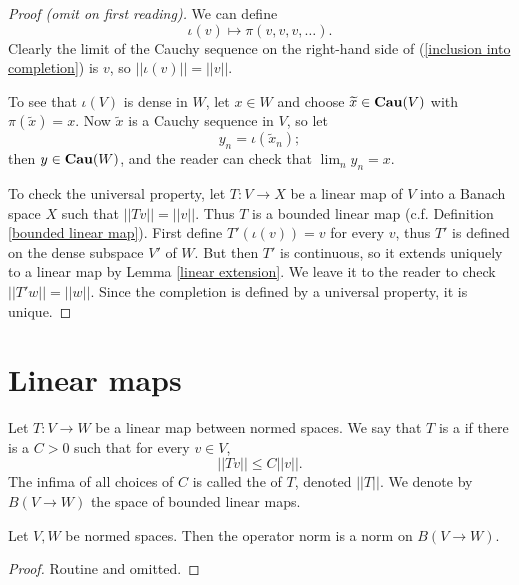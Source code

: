 \begin{proof}[Proof (omit on first reading)]
We can define
\begin{equation}
\label{inclusion into completion}
\iota(v) \mapsto \pi(v, v, v, \dots).
\end{equation}
Clearly the limit of the Cauchy sequence on the right-hand side of (\ref{inclusion into completion}) is $v$, so $||\iota(v)|| = ||v||$.

To see that $\iota(V)$ is dense in $W$, let $x \in W$ and choose $\widetilde x \in \mathbf{Cau} (V)$ with $\pi(\widetilde x) = x$.
Now $\widetilde x$ is a Cauchy sequence in $V$, so let
\[y_{n} = \iota(\widetilde x_{n});\]
then $y \in \mathbf{Cau} (W)$, and the reader can check that $\lim_{n} y_{n} = x$.

To check the universal property, let $T: V \to X$ be a linear map of $V$ into a Banach space $X$ such that $||Tv|| = ||v||$.
Thus $T$ is a bounded linear map (c.f. Definition \ref{bounded linear map}). First define $T'(\iota(v)) = v$ for every $v$, thus $T'$ is defined on the dense subspace $V'$ of $W$.
But then $T'$ is continuous, so it extends uniquely to a linear map by Lemma \ref{linear extension}. We leave it to the reader to check $||T'w|| = ||w||$.
Since the completion is defined by a universal property, it is unique.
\end{proof}

\section{Linear maps}
\begin{definition}
\label{bounded linear map}
Let $T: V\to W$ be a linear map between normed spaces. We say that $T$ is a  if there is a $C>0$ such that for every $v \in V$,
\[||Tv|| \leq C||v||.\]
The infima of all choices of $C$ is called the  of $T$, denoted $||T||$.
We denote by $B(V \to W)$ the space of bounded linear maps.
\end{definition}

\begin{lemma}
Let $V,W$ be normed spaces.
Then the operator norm is a norm on $B(V \to W)$.
\end{lemma}
\begin{proof}
Routine and omitted.
\end{proof}


